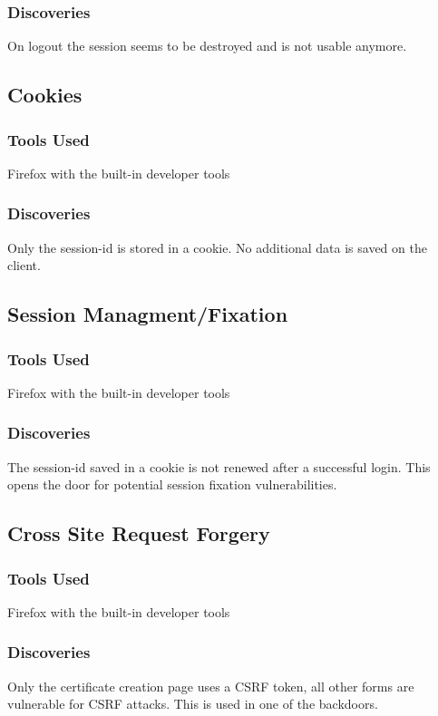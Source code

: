 \documentclass{article}
\begin{document}
\subsubsection{Discoveries}
On logout the session seems to be destroyed and is not usable anymore.

\subsection{Cookies}
\subsubsection{Tools Used}
Firefox with the built-in developer tools

\subsubsection{Discoveries}
Only the session-id is stored in a cookie. No additional data is saved on the client.

\subsection{Session Managment/Fixation}
\subsubsection{Tools Used}
Firefox with the built-in developer tools

\subsubsection{Discoveries}
The session-id saved in a cookie is not renewed after a successful login. This opens the door for potential session fixation vulnerabilities.

\subsection{Cross Site Request Forgery}
\subsubsection{Tools Used}
Firefox with the built-in developer tools

\subsubsection{Discoveries}
Only the certificate creation page uses a CSRF token, all other forms are vulnerable for CSRF attacks. This is used in one of the backdoors.
\end{document}
